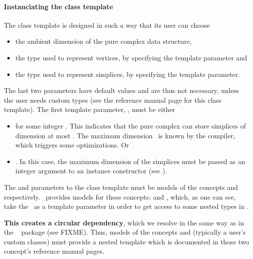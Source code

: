 {\paragraph{Instanciating the class template}

The 
class template is designed in such a way that its user can choose
\begin{itemize}
\item the ambient dimension of the pure complex data structure,
\item the type used to represent vertices, by specifying the 
template parameter and
\item the type used to represent simplices, by specifying the
 template parameter.
\end{itemize}

The last two parameters have default values and are thus not necessary, unless
the user needs custom types (see the reference manual page for this class
template). The first template parameter, , must be either
\begin{itemize}
\item \ccPureGlobalScope{} for some integer \ad. This
indicates that the pure complex can store simplices of dimension at most
\ad. The maximum dimension \ad\ is known by the compiler, which
triggers some optimizations. Or
\item \ccPureGlobalScope{}. In this case, the maximum
dimension of the simplices must be passed as an integer argument to an instance
constructor (see ).
\end{itemize}

The  and  parameters to the class template
must be models of the concepts  and
 respectively. \cgal\ provides models for these
concepts:  and
, which, as one
can see, take the \pcds\ as a template parameter in order to get access to
some nested types in \pcds.

\textbf{This creates a circular dependency}, which we resolve in the same way
as in the \cgal\  package (see FIXME). Thus, models of
the concepts  and
 (typically a
user's custom classes) must provide a nested template  which
is documented in those two concept's reference manual pages.

}
